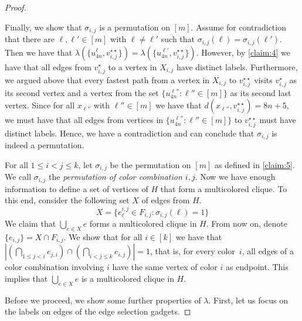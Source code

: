\documentclass[a4paper,UKenglish,cleveref, autoref, thm-restate]{lipics-v2021}
\begin{document}
\begin{proof}
\begin{claimproof}
    Finally, we show that $\sigma_{i,j}$ is a permutation on $[m]$. Assume for contradiction that there are $\ell,\ell'\in[m]$ with $\ell\neq \ell'$ such that $\sigma_{i,j}(\ell)=\sigma_{i,j}(\ell')$. Then we have that $\lambda(\{u^{\ell}_{4n},v_{i,j}^{\star\star}\})=\lambda(\{u^{\ell'}_{4n},v_{i,j}^{\star\star}\})$. However, by \cref{claim:4} we have that all edges from $v_{i,j}^\star$ to a vertex in $X_{i,j}$ have distinct labels. Furthermore, we argued above that every fastest path from a vertex in $X_{i,j}$ to $v_{i,j}^{\star\star}$ visits $v_{i,j}^\star$ as its second vertex and a vertex from the set $\{u^{\ell''}_{4n} :  \ell''\in[m]\}$ as its second last vertex. Since for all $x_{\ell''}$ with $\ell''\in[m]$ we have that $d(x_{\ell''},v_{i,j}^{\star\star})=8n+5$, we must have that all edges from vertices in $\{u^{\ell''}_{4n} :  \ell''\in[m]\}$ to $v_{i,j}^{\star\star}$ must have distinct labels. Hence, we have a contradiction and can conclude that $\sigma_{i,j}$ is indeed a permutation.
\end{claimproof}

For all $1\le i<j\le k$, let $\sigma_{i,j}$ be the permutation on $[m]$ as defined in \cref{claim:5}. We call $\sigma_{i,j}$ the \emph{permutation of color combination $i,j$}. 
Now we have enough information to define a set of vertices of $H$ that form a multicolored clique.
To this end, consider the following set $X$ of edges from $H$.
\[
X=\{e_\ell^{i,j}\in F_{i,j} :  \sigma_{i,j}(\ell)=1\}
\]
We claim that $\bigcup_{e\in X}e$ forms a multicolored clique in $H$.
From now on, denote $\{e_{i,j}\}=X\cap F_{i,j}$. We show that for all $i\in [k]$ we have that $|(\bigcap_{1\le j<i} e_{j,i}) \cap (\bigcap_{i<j\le k} e_{i,j})|=1$, that is, for every color~$i$, all edges of a color combination involving $i$ have the same vertex of color $i$ as endpoint. This implies that $\bigcup_{e\in X}e$ is a multicolored clique in $H$.

Before we proceed, we show some further properties of $\lambda$. First, let us focus on the labels on edges of the edge selection gadgets.


\end{proof}
\end{document}
